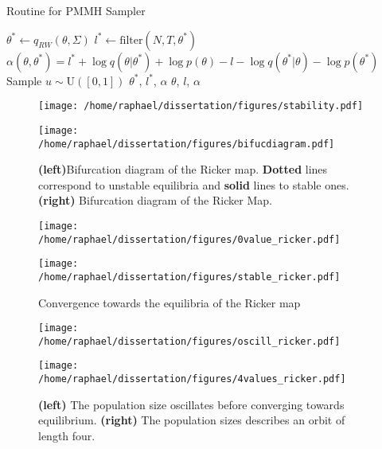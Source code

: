 \documentclass[12pt]{article}
\begin{document}
	\begin{algorithm}
		\caption{Routine for PMMH Sampler}\label{routine}
		\begin{algorithmic}[1]
			\State $\theta^* \gets q_{RW}(\theta, \Sigma)$
			\State $l^* \gets \text{filter}(N, T, \theta^*)$
			\State $\alpha(\theta, \theta^*) = l^*+\log q(\theta|\theta^*) + \log p(\theta) - l - \log q(\theta^*|\theta) - \log p(\theta^*)$
			\State Sample $u \sim \text{U}([0, 1])$
			\State \Return $\theta^*$, $l^*$, $\alpha$
			\Else
			\State \Return $\theta$, $l$, $\alpha$
			\EndIf
			\EndFunction
		\end{algorithmic}
	\end{algorithm}
	
	
	\begin{figure}[htb]
		\centering
		\begin{minipage}{0.4\textwidth}
			\centering
			\texttt{[image: /home/raphael/dissertation/figures/stability.pdf]}
		\end{minipage}
		\begin{minipage}{0.4\textwidth}
			\centering
			\texttt{[image: /home/raphael/dissertation/figures/bifucdiagram.pdf]}
		\end{minipage}
		\caption{\textbf{(left)}Bifurcation diagram of the Ricker map. \textbf{Dotted} lines correspond to unstable equilibria and \textbf{solid} lines to stable ones. \textbf{(right)} Bifurcation diagram of the Ricker Map.}
		\label{fig:stability}
	\end{figure}

	\begin{figure}[htb]
		\centering
		\begin{minipage}{0.4\textwidth}
			\centering
			\texttt{[image: /home/raphael/dissertation/figures/0value\_ricker.pdf]}
		\end{minipage}
		\begin{minipage}{0.4\textwidth}
			\centering
			\texttt{[image: /home/raphael/dissertation/figures/stable\_ricker.pdf]}
		\end{minipage}
		\caption{Convergence towards the equilibria of the Ricker map}
		\label{fig:stab}
	\end{figure}

	\begin{figure}[htb]
		\centering
		\begin{minipage}{0.4\textwidth}
			\centering
			\texttt{[image: /home/raphael/dissertation/figures/oscill\_ricker.pdf]}
		\end{minipage}
		\begin{minipage}{0.4\textwidth}
			\centering
			\texttt{[image: /home/raphael/dissertation/figures/4values\_ricker.pdf]}
		\end{minipage}
		\caption{\textbf{(left)} The population size oscillates before converging towards equilibrium. \textbf{(right)} The population sizes describes an orbit of length four.}
		\label{fig:oscill}
	\end{figure}
	
\end{document}
